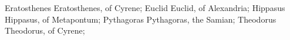 \DefFriend Eratosthenes     Eratosthenes, of Cyrene; %
\DefFriend Euclid           Euclid, of Alexandria;
\DefFriend Hippasus         Hippasus, of Metapontum; %
\DefFriend Pythagoras       Pythagoras, the Samian; %
\DefFriend Theodorus        Theodorus, of Cyrene; %

